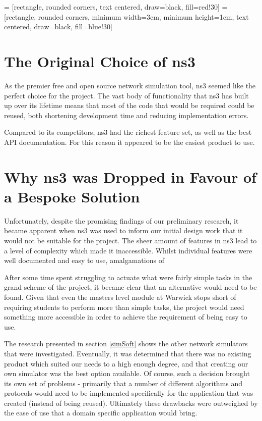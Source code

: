  = [rectangle, rounded corners, text centered, draw=black, fill=red!30]
 = [rectangle, rounded corners, minimum width=3cm, minimum height=1cm, text centered, draw=black, fill=blue!30]

\section{The Original Choice of ns3}
\label{ns3decision}
As the premier free and open source network simulation tool, ns3 seemed like the perfect choice for the project. The vast body of functionality that ns3 has built up over its lifetime means that most of the code that would be required could be reused, both shortening development time and reducing implementation errors.

Compared to its competitors, ns3 had the richest feature set, as well as the best API documentation. For this reason it appeared to be the easiest product to use.

\section{Why ns3 was Dropped in Favour of a Bespoke Solution}
Unfortunately, despite the promising findings of our preliminary research, it became apparent when ns3  was used to inform our initial design work that it would not be suitable for the project. The sheer amount of features in ns3 lead to a level of complexity which made it inaccessible. Whilst individual features were well documented and easy to use, amalgamations of%

After some time spent struggling to actuate what were fairly simple tasks in the grand scheme of the project, it became clear that an alternative would need to be found. Given that even the masters level module at Warwick stops short of requiring students to perform more than simple tasks, the project would need something more accessible in order to achieve the requirement of being easy to use.

The research presented in section \ref{simSoft} shows the other network simulators that were investigated. Eventually, it was determined that there was no existing product which suited our needs to a high enough degree, and that creating our own simulator was the best option available. Of course, such a decision brought its own set of problems - primarily that a number of different algorithms and protocols would need to be implemented specifically for the application that was created (instead of being reused). Ultimately these drawbacks were outweighed by the ease of use that a domain specific application would bring.

